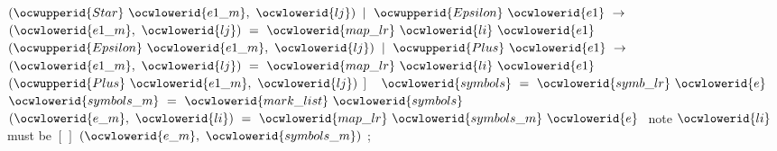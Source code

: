 \documentclass[12pt]{article}
\begin{document}
$(\ocwupperid{Star}~\ocwlowerid{e1\_m},~\ocwlowerid{lj})$\ocweol
\ocwindent{2.00em}
$\mid{}~\ocwupperid{Epsilon}~\ocwlowerid{e1}~\rightarrow{}~$\ocweol
\ocwindent{4.00em}
~$(\ocwlowerid{e1\_m},~\ocwlowerid{lj})~=~\ocwlowerid{map\_lr}~\ocwlowerid{li}~\ocwlowerid{e1}~$\ocweol
\ocwindent{4.00em}
$(\ocwupperid{Epsilon}~\ocwlowerid{e1\_m},~\ocwlowerid{lj})$\ocweol
\ocwindent{2.00em}
$\mid{}~\ocwupperid{Plus}~\ocwlowerid{e1}~\rightarrow{}~$\ocweol
\ocwindent{4.00em}
~$(\ocwlowerid{e1\_m},~\ocwlowerid{lj})~=~\ocwlowerid{map\_lr}~\ocwlowerid{li}~\ocwlowerid{e1}~$\ocweol
\ocwindent{4.00em}
$(\ocwupperid{Plus}~\ocwlowerid{e1\_m},~\ocwlowerid{lj})$\ocweol
\ocwindent{2.00em}
$]~$\ocweol
\ocwindent{1.00em}
~$\ocwlowerid{symbols}~=~\ocwlowerid{symb\_lr}~\ocwlowerid{e}~$\ocweol
\ocwindent{1.00em}
~$\ocwlowerid{symbols\_m}~=~\ocwlowerid{mark\_list}~\ocwlowerid{symbols}~$\ocweol
\ocwindent{1.00em}
~$(\ocwlowerid{e\_m},~\ocwlowerid{li})~=~\ocwlowerid{map\_lr}~\ocwlowerid{symbols\_m}~\ocwlowerid{e}~$\ocweol
\ocwindent{2.00em}
\ocwbc{} note \ocwbegindcode{}$\ocwlowerid{li}$\ocwenddcode{} must be \ocwbegindcode{}$[\,]$\ocwenddcode{} \ocwec{}\ocweol
\ocwindent{1.00em}
$(\ocwlowerid{e\_m},~\ocwlowerid{symbols\_m})$\ocweol
\ocwindent{0.00em}
;\medskip
\end{document}
